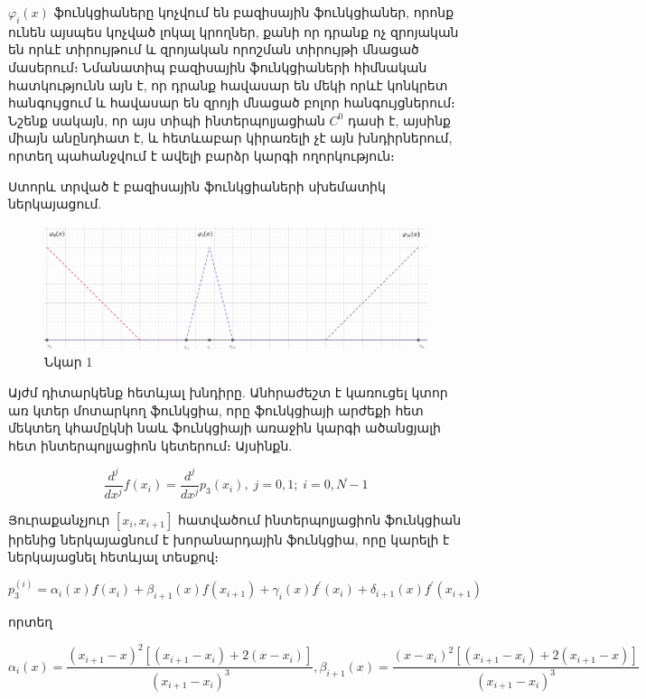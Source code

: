 \documentclass[fleqn, bachelor,subf,12pt,notitlepage]{disser}
\begin{document}
$\varphi_{i}\left(x\right)$ ֆունկցիաները կոչվում են բազիսային ֆունկցիաներ, որոնք ունեն այսպես կոչված լոկալ կրողներ, քանի որ դրանք ոչ զրոյական են որևէ տիրույթում և զրոյական որոշման տիրույթի մնացած մասերում։
Նմանատիպ բազիսային ֆունկցիաների հիմնական հատկությունն այն է, որ դրանք հավասար են մեկի որևէ կոնկրետ հանգույցում և հավասար են զրոյի մնացած բոլոր հանգույցներում։ Նշենք սակայն, որ այս տիպի ինտերպոլյացիան $C^{0}$ դասի է, այսինք միայն անընդհատ է, և հետևաբար կիրառելի չէ այն խնդիրներում, որտեղ պահանջվում է ավելի բարձր կարգի ողորկություն։


\newpage

Ստորև տրված է բազիսային ֆունկցիաների սխեմատիկ ներկայացում.
\begin{figure}[h!]
\centering
\includegraphics[width=1.0\textwidth]{images/image_1}
\captionsetup{labelformat=empty}
\caption{\hfill Նկար 1}
\end{figure}


\newpage

Այժմ դիտարկենք հետևյալ խնդիրը.
Անհրաժեշտ է կառուցել  կտոր առ կտեր մոտարկող ֆունկցիա, որը ֆունկցիայի արժեքի հետ մեկտեղ կհամըկնի նաև ֆունկցիայի առաջին կարգի ածանցյալի հետ ինտերպոլյացիոն կետերում։ Այսինքն.

$$ \dfrac{d^{j}}{dx^j}f(x_{i})=\dfrac{d^{j}}{dx^j}p_{3}(x_{i}),   \; j=0, 1;  \; i=\overline{0, N-1}$$

Յուրաքանչյուր $\left[x_{i}, x_{i+1}\right]$ հատվածում ինտերպոլյացիոն ֆունկցիան իրենից ներկայացնում է խորանարդային ֆունկցիա, որը կարելի է ներկայացնել հետևյալ տեսքով։

$$p_{3}^{\left(i\right)} = \alpha_{i}(x)f(x_{i})+\beta_{i+1}(x)f(x_{i+1})+\gamma_{i}(x)f^{'}(x_{i})+\delta_{i+1}(x)f^{'}(x_{i+1})$$

որտեղ 

$$\alpha_{i}(x)=\dfrac{\left(x_{i+1}-x\right)^{2}\left[\left(x_{i+1}-x_{i}\right)+2\left(x-x_{i}\right)\right]}{\left(x_{i+1}-x_{i}\right)^{3}}, \beta_{i+1}(x)=\dfrac{\left(x-x_{i}\right)^{2}\left[\left(x_{i+1}-x_{i}\right)+2\left(x_{i+1}-x\right)\right]}{\left(x_{i+1}-x_{i}\right)^{3}}$$
\end{document}
